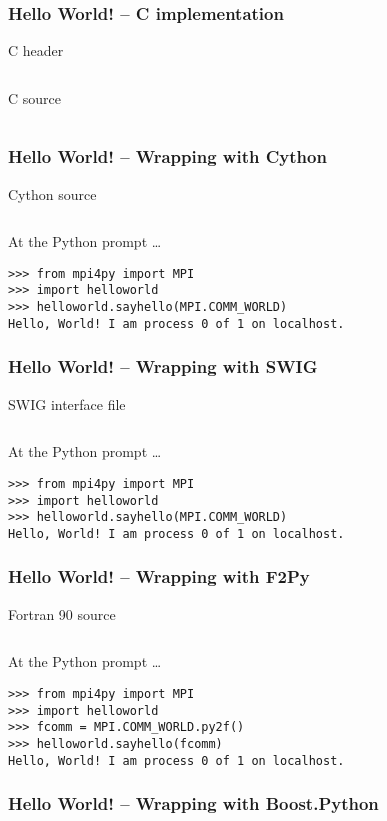 \begin{frame}[fragile]
  \frametitle{Hello World! -- C implementation}
  \begin{block}{C header}
    \footnotesize
    \inputminted[linenos]{c}{helloworld.h}
  \end{block}
  \begin{block}{C source}
    \footnotesize
    \inputminted[linenos]{c}{helloworld.c}
  \end{block}
\end{frame}
    
\begin{frame}[fragile]
  \frametitle{Hello World! -- Wrapping with \textbf{Cython}}
  \begin{block}{Cython source}
    \footnotesize
    \inputminted[linenos]{cython}{helloworld.pyx}
  \end{block}
  \begin{block}{At the Python prompt \ldots}
    \footnotesize
\begin{verbatim}
>>> from mpi4py import MPI
>>> import helloworld
>>> helloworld.sayhello(MPI.COMM_WORLD)
Hello, World! I am process 0 of 1 on localhost.
\end{verbatim}
  \end{block}
\end{frame}

\begin{frame}[fragile]
  \frametitle{Hello World! -- Wrapping with \textbf{SWIG}}
  \begin{block}{SWIG interface file}
    \footnotesize
    \inputminted[linenos]{c}{helloworld.i}
  \end{block}
  \begin{block}{At the Python prompt \ldots}
    \footnotesize
\begin{verbatim}
>>> from mpi4py import MPI
>>> import helloworld
>>> helloworld.sayhello(MPI.COMM_WORLD)
Hello, World! I am process 0 of 1 on localhost.
\end{verbatim}
  \end{block}
\end{frame}

\begin{frame}[fragile]
  \frametitle{Hello World! -- Wrapping with \textbf{F2Py}}
  \begin{block}{Fortran 90 source}
    \footnotesize
    \inputminted[linenos]{fortran}{helloworld.f90}
  \end{block}
  \begin{block}{At the Python prompt \ldots}
    \footnotesize
\begin{verbatim}
>>> from mpi4py import MPI
>>> import helloworld
>>> fcomm = MPI.COMM_WORLD.py2f()
>>> helloworld.sayhello(fcomm)
Hello, World! I am process 0 of 1 on localhost.
\end{verbatim}
  \end{block}
\end{frame}

\begin{frame}[fragile]
  \frametitle{Hello World! -- Wrapping with \textbf{Boost.Python}}
  \footnotesize
  \inputminted[linenos]{cpp}{helloworld.cxx}
\end{frame}
